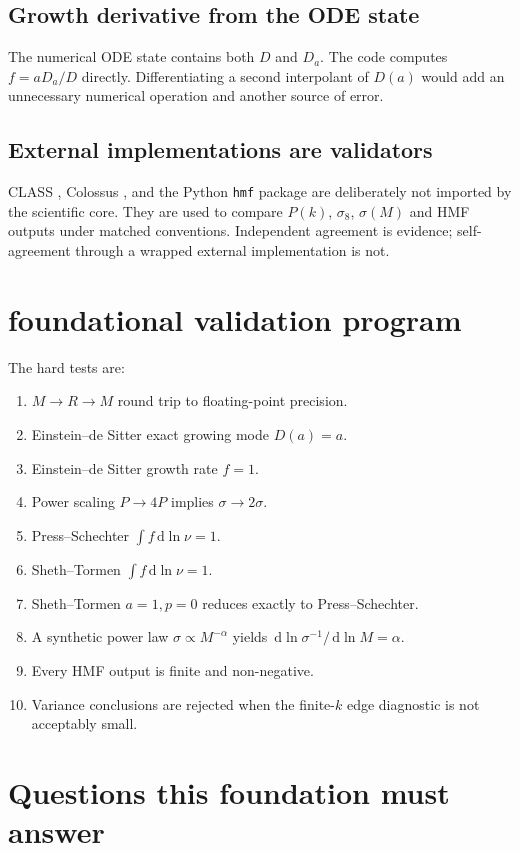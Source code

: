 \documentclass[11pt]{article}
\newcommand{\dd}{\,\mathrm d}
\begin{document}
\subsection{Growth derivative from the ODE state}
The numerical ODE state contains both $D$ and $D_a$. The code computes $f=aD_a/D$ directly. Differentiating a second interpolant of $D(a)$ would add an unnecessary numerical operation and another source of error.

\subsection{External implementations are validators}
CLASS \cite{Blas2011}, Colossus \cite{Diemer2018}, and the Python \texttt{hmf} package \cite{Murray2013} are deliberately not imported by the scientific core. They are used to compare $P(k)$, $\sigma_8$, $\sigma(M)$ and HMF outputs under matched conventions. Independent agreement is evidence; self-agreement through a wrapped external implementation is not.


\section{foundational validation program}

The hard tests are:
\begin{enumerate}
\item $M\rightarrow R\rightarrow M$ round trip to floating-point precision.
\item Einstein--de Sitter exact growing mode $D(a)=a$.
\item Einstein--de Sitter growth rate $f=1$.
\item Power scaling $P\rightarrow4P$ implies $\sigma\rightarrow2\sigma$.
\item Press--Schechter $\int f\dd\ln\nu=1$.
\item Sheth--Tormen $\int f\dd\ln\nu=1$.
\item Sheth--Tormen $a=1,p=0$ reduces exactly to Press--Schechter.
\item A synthetic power law $\sigma\propto M^{-\alpha}$ yields $\dd\ln\sigma^{-1}/\dd\ln M=\alpha$.
\item Every HMF output is finite and non-negative.
\item Variance conclusions are rejected when the finite-$k$ edge diagnostic is not acceptably small.
\end{enumerate}

\section{Questions this foundation must answer}
\end{document}
